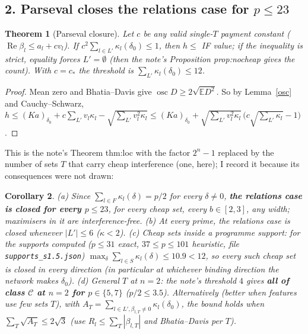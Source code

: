 \documentclass[11pt]{article}
\newtheorem{theorem}{Theorem}\newtheorem{lemma}[theorem]{Lemma}\newtheorem{proposition}[theorem]{Proposition}
\newtheorem{corollary}[theorem]{Corollary}\newtheorem{conjecture}[theorem]{Conjecture}
\theoremstyle{remark}\newtheorem{remark}[theorem]{Remark}
\renewcommand{\Re}{\operatorname{Re}}\newcommand{\osc}{\operatorname{osc}}
\begin{document}
\subsection*{2. Parseval closes the relations case for $p\le23$}
\begin{theorem}[Parseval closure]\label{parseval}
Let $c$ be any valid single-$T$ payment constant ($\Re\beta_l\le a_l+cv_l$).  If $c^2\sum_{l\in L'}\kappa_l(\delta_0)\le1$, then
$h\le$ IF value; if the inequality is strict, equality forces $L'=\emptyset$ (then the note's Proposition prop:nocheap gives the count).
With $c=c_*$ the threshold is $\sum_{L'}\kappa_l(\delta_0)\le12$.
\end{theorem}
\begin{proof}
Mean zero and Bhatia--Davis give $\osc D\ge2\sqrt{\mathbb ED^2}$.  So by Lemma~\ref{osc} and Cauchy--Schwarz,
$h\le(Ka)_{\delta_0}+c\sum_{L'}v_l\kappa_l-\sqrt{\sum_{L'}v_l^2\kappa_l}\le(Ka)_{\delta_0}+\sqrt{\textstyle\sum_{L'}v_l^2\kappa_l}\,\big(c\sqrt{\textstyle\sum_{L'}\kappa_l}-1\big)$.
\end{proof}
This is the note's Theorem thm:loc with the factor $2^n-1$ replaced by the number of sets $T$ that carry cheap interference
(one, here); I record it because its consequences were not drawn:
\begin{corollary}\label{cor23}
(a) Since $\sum_{l\in F}\kappa_l(\delta)=p/2$ for every $\delta\ne0$, \textbf{the relations case is closed for every $p\le23$}, for every
cheap set, every $b\in[2,3]$, any width; maximisers in it are interference-free.
(b) At every prime, the relations case is closed whenever $|L'|\le6$ ($\kappa<2$).
(c) Cheap sets inside a programme support: for the supports computed ($p\le31$ exact, $37\le p\le101$ heuristic, file
\texttt{supports\_s1.5.json}) $\max_{\delta}\sum_{l\in S}\kappa_l(\delta)\le10.9<12$, so every such cheap set is closed in \emph{every}
direction (in particular at whichever binding direction the network makes $\delta_0$).
(d) General $T$ at $n=2$: the note's threshold $4$ gives \textbf{all of class $\mathcal C$ at $n=2$ for $p\in\{5,7\}$} ($p/2\le3.5$).  Alternatively
(better when features use few sets $T$), with $A_T=\sum_{l\in L',\beta_{l,T}\ne0}\kappa_l(\delta_0)$, the bound holds when $\sum_T\sqrt{A_T}\le2\sqrt3$ (use $R_l\le\sum_T|\beta_{l,T}|$ and
Bhatia--Davis per $T$).
\end{corollary}
\end{document}

